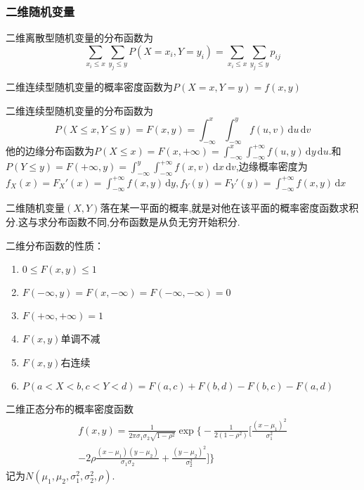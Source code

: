 \subsubsection{二维随机变量}
二维离散型随机变量的分布函数为
\begin{equation*}
    \sum_{x_i\leqslant x}\sum_{y_j\leqslant y}P(X=x_i,Y=y_i)=\sum_{x_i\leqslant x}\sum_{y_j\leqslant y}p_{ij}
\end{equation*}

二维连续型随机变量的概率密度函数为$P(X=x,Y=y)=f(x,y)$

二维连续型随机变量的分布函数为
\begin{equation*}
    P(X \leqslant x,Y \leqslant y)=F(x,y)=\int_{-\infty}^{x}\int_{-\infty}^{y}f(u,v)  \,\mathrm{d} u\,\mathrm{d} v
\end{equation*}
他的边缘分布函数为$P(X \leqslant x)=F(x,+\infty)=\int_{-\infty}^{x}  \int_{-\infty}^{+\infty}f(u,y)  \,\mathrm{d} y \,\mathrm{d}u$.和$P(Y \leqslant y)=F(+\infty,y)=\int_{-\infty}^{y} \int_{-\infty}^{+\infty}f(x,v)  \,\mathrm{d} x \,\mathrm{d}v $,边缘概率密度为$f_X(x)=F_X'(x)=\int_{-\infty}^{+\infty} f(x,y) \,\mathrm{d}y ,f_Y(y)=F_Y'(y)=\int_{-\infty}^{+\infty} f(x,y) \,\mathrm{d}x $

二维随机变量$(X,Y)$落在某一平面的概率,就是对他在该平面的概率密度函数求积分.这与求分布函数不同,分布函数是从负无穷开始积分.

二维分布函数的性质：
\begin{enumerate}
    \item $0 \leqslant F(x,y) \leqslant 1$
    \item $F(-\infty,y)=F(x,-\infty)=F(-\infty,-\infty)=0$
    \item $F(+\infty,+\infty)=1$
    \item $F(x,y)$单调不减
    \item $F(x,y)$右连续
    \item $P(a<X<b,c<Y<d)=F(a,c)+F(b,d)-F(b,c)-F(a,d)$
\end{enumerate}

二维正态分布的概率密度函数
\begin{gather*}
	f(x, y) =\frac{1}{2 \pi \sigma_{1} \sigma_{2} \sqrt{1-\rho^{2}}} \exp \bigg\{-\frac{1}{2\left(1-\rho^{2}\right)}
	\bigg[\frac{\left(x-\mu_{1}\right)^{2}}{\sigma_{1}^{2}}	\\
	-2 \rho \frac{\left(x-\mu_{1}\right)\left(y-\mu_{2}\right)}{\sigma_{1} \sigma_{2}}+\frac{\left(y-\mu_{2}\right)^{2}}{\sigma_{2}^{2}}
	\bigg] \bigg\}
\end{gather*}
记为$N(\mu_1,\mu_2,\sigma_1^2,\sigma_2^2,\rho)$.

